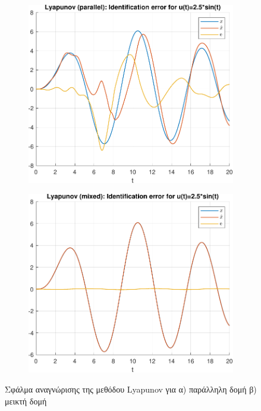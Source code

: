 \documentclass[a4paper,12pt]{article}
\begin{document}
\begin{figure}[h!]
    \centering
    \begin{subfigure}{0.45\textwidth}
        \centering
        \includegraphics[width=\linewidth]{plot/task1_identification_error_lyapunov_parallel.pdf}
        \caption{}
        \label{fig:task1_identification_error_lyapunov_parallel}
    \end{subfigure}
    \hfill
    \begin{subfigure}{0.45\textwidth}
        \centering
        \includegraphics[width=\linewidth]{plot/task1_identification_error_lyapunov_mixed.pdf}
        \caption{}
        \label{fig:task1_identification_error_lyapunov_mixed}
    \end{subfigure}
    \caption{Σφάλμα αναγνώρισης της μεθόδου Lyapunov για 
    α) παράλληλη δομή β) μεικτή δομή}
    \label{fig:task1_identification_error_lyapunov}
\end{figure}
\end{document}
